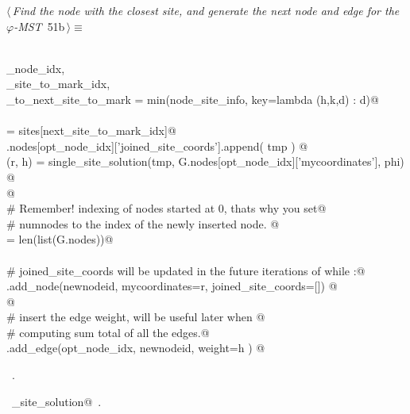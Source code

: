 \documentclass[11.5pt]{report}
\begin{document}
\needspace{3cm}
\vspace{-0.8cm} \newchunk
\begin{flushleft} \small
\begin{minipage}{\linewidth}\label{scrap76}\raggedright\small
{} $\langle\,${\itshape Find the node with the closest site, and generate the next node and edge for the $\varphi$-MST}\nobreak\ {\footnotesize {51b}}$\,\rangle\equiv$
\vspace{-1ex}
\begin{list}{}{} \item
\mbox{}\verb@@\\
\mbox{}\verb@opt_node_idx,          \@\\
\mbox{}\verb@next_site_to_mark_idx, \@\\
\mbox{}\verb@distance_to_next_site_to_mark = min(node_site_info, key=lambda (h,k,d) : d)@\\
\mbox{}\verb@@\\
\mbox{}\verb@tmp = sites[next_site_to_mark_idx]@\\
\mbox{}\verb@G.nodes[opt_node_idx]['joined_site_coords'].append(  tmp   ) @\\
\mbox{}\verb@(r, h) = single_site_solution(tmp, G.nodes[opt_node_idx]['mycoordinates'], phi) @\\
\mbox{}\verb@          @\\
\mbox{}\verb@# Remember! indexing of nodes started at 0, thats why you set@\\
\mbox{}\verb@# numnodes to the index of the newly inserted node. @\\
\mbox{}\verb@newnodeid = len(list(G.nodes))@\\
\mbox{}\verb@@\\
\mbox{}\verb@# joined_site_coords will be updated in the future iterations of while :@\\
\mbox{}\verb@G.add_node(newnodeid, mycoordinates=r, joined_site_coords=[]) @\\
\mbox{}\verb@  @\\
\mbox{}\verb@# insert the edge weight, will be useful later when @\\
\mbox{}\verb@# computing sum total of all the edges.@\\
\mbox{}\verb@G.add_edge(opt_node_idx, newnodeid, weight=h ) @\\
\mbox{}\verb@@{\NWsep}
\end{list}
\vspace{-1.5ex}
\footnotesize
\begin{list}{}{\setlength{\itemsep}{-\parsep}\setlength{\itemindent}{-\leftmargin}}
\item \NWtxtMacroRefIn\ .
\item \NWtxtIdentsUsed\nobreak\  \verb@single_site_solution@\nobreak\ .
\item{}
\end{list}
\end{minipage}\vspace{4ex}
\end{flushleft}
\end{document}
